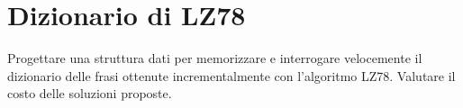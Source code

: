 \chapter{Dizionario di LZ78}

\begin{problem*}
  Progettare una struttura dati per memorizzare e interrogare velocemente
  il dizionario delle frasi ottenute incrementalmente con l'algoritmo
  LZ78. Valutare il costo delle soluzioni proposte.
\end{problem*}

